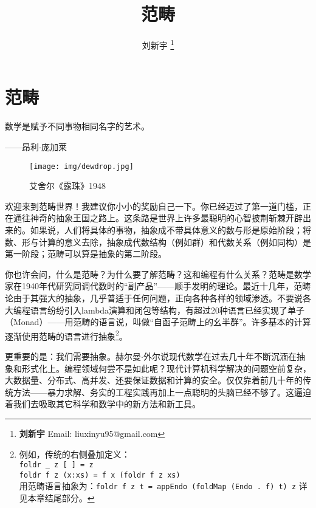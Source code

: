 \documentclass{article}
\begin{document}
\title{范畴}

\author{刘新宇
\thanks{{\bfseries 刘新宇} \newline
  Email: liuxinyu95@gmail.com \newline}
  }

\maketitle
\fi


\ifx\wholebook\relax
\chapter{范畴}
\fi

\epigraph{数学是赋予不同事物相同名字的艺术。}{——昂利$\cdot$庞加莱}


\begin{wrapfigure}{R}{0.4\textwidth}
 \centering
 \texttt{[image: img/dewdrop.jpg]}
 \captionsetup{labelformat=empty}
 \caption{艾舍尔《露珠》1948}
 \label{fig:Escher-Dewdrop-1948}
\end{wrapfigure}

欢迎来到范畴世界！我建议你小小的奖励自己一下。你已经迈过了第一道门槛，正在通往神奇的抽象王国之路上。这条路是世界上许多最聪明的心智披荆斩棘开辟出来的。如果说，人们将具体的事物，抽象成不带具体意义的数与形是原始阶段；将数、形与计算的意义去除，抽象成代数结构（例如群）和代数关系（例如同构）是第一阶段；范畴可以算是抽象的第二阶段。

你也许会问，什么是范畴？为什么要了解范畴？这和编程有什么关系？范畴是数学家在1940年代研究同调代数时的“副产品”——顺手发明的理论。最近十几年，范畴论由于其强大的抽象，几乎普适于任何问题，正向各种各样的领域渗透。不要说各大编程语言纷纷引入lambda演算和闭包等结构，有超过20种语言已经实现了单子（Monad）\cite{Monad-Haskell-Wiki}——用范畴的语言说，叫做“自函子范畴上的幺半群”。许多基本的计算逐渐使用范畴的语言进行抽象\footnote{例如，传统的右侧叠加定义：\\
\texttt{foldr \_ z {[} {]} = z} \\
\texttt{foldr f z (x:xs) = f x (foldr f z xs)} \\
用范畴语言抽象为：\texttt{foldr f z t = appEndo (foldMap (Endo . f) t) z} 详见本章结尾部分。}。

更重要的是：我们需要抽象。赫尔曼$\cdot$外尔说现代数学在过去几十年不断沉湎在抽象和形式化上。编程领域何尝不是如此呢？现代计算机科学解决的问题空前复杂，大数据量、分布式、高并发、还要保证数据和计算的安全。仅仅靠着前几十年的传统方法——暴力求解、务实的工程实践再加上一点聪明的头脑已经不够了。这逼迫着我们去吸取其它科学和数学中的新方法和新工具。
\end{document}
